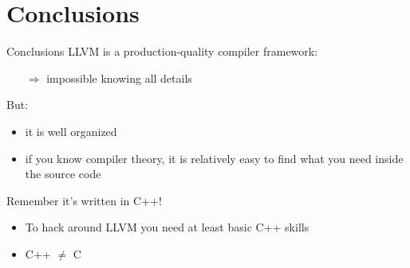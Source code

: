 
\section{Conclusions}


\begin{frame}{Conclusions}
LLVM is a \alert{production-quality} compiler framework:

\begin{itemize}
\item[$\Rightarrow$] impossible knowing all details
\end{itemize}

\vfill
But:

\begin{itemize}
\item it is well organized
\item if you know compiler theory, it is relatively easy to find what you need inside the source code
\end{itemize}

\vfill

Remember it's written in C++! 
\begin{itemize}
\item To hack around LLVM you need at least basic C++ skills
\item C++ $\neq$ C
\end{itemize}
\end{frame}
